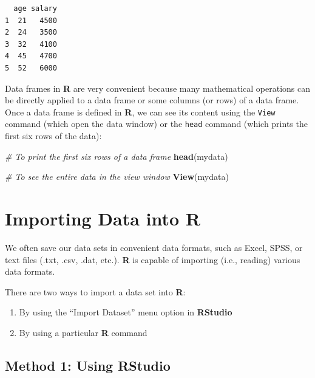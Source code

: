 \documentclass[]{book}
\newenvironment{Shaded}{\begin{snugshade}}{\end{snugshade}}
\newcommand{\CommentTok}[1]{\textcolor[rgb]{0.56,0.35,0.01}{\textit{#1}}}
\newcommand{\KeywordTok}[1]{\textcolor[rgb]{0.13,0.29,0.53}{\textbf{#1}}}
\newcommand{\NormalTok}[1]{#1}
\providecommand{\tightlist}{%
  \setlength{\itemsep}{0pt}\setlength{\parskip}{0pt}}
\begin{document}
\begin{verbatim}
  age salary
1  21   4500
2  24   3500
3  32   4100
4  45   4700
5  52   6000
\end{verbatim}

Data frames in \textbf{R} are very convenient because many mathematical operations can be directly applied to a data frame or some columns (or rows) of a data frame. Once a data frame is defined in \textbf{R}, we can see its content using the \texttt{View} command (which open the data window) or the \texttt{head} command (which prints the first six rows of the data):

\begin{Shaded}
\begin{Highlighting}[]
\CommentTok{# To print the first six rows of a data frame}
\KeywordTok{head}\NormalTok{(mydata)}

\CommentTok{# To see the entire data in the view window}
\KeywordTok{View}\NormalTok{(mydata)}
\end{Highlighting}
\end{Shaded}

\hypertarget{importing-data-into-r}{%
\section{\texorpdfstring{Importing Data into \textbf{R}}{Importing Data into R}}\label{importing-data-into-r}}

We often save our data sets in convenient data formats, such as Excel, SPSS, or text files (.txt, .csv, .dat, etc.). \textbf{R} is capable of importing (i.e., reading) various data formats.

There are two ways to import a data set into \textbf{R}:

\begin{enumerate}
\def\labelenumi{\arabic{enumi}.}
\tightlist
\item
  By using the ``Import Dataset'' menu option in \textbf{RStudio}
\item
  By using a particular \textbf{R} command
\end{enumerate}

\hypertarget{method-1-using-rstudio}{%
\subsection{\texorpdfstring{Method 1: Using \textbf{RStudio}}{Method 1: Using RStudio}}\label{method-1-using-rstudio}}
\end{document}
